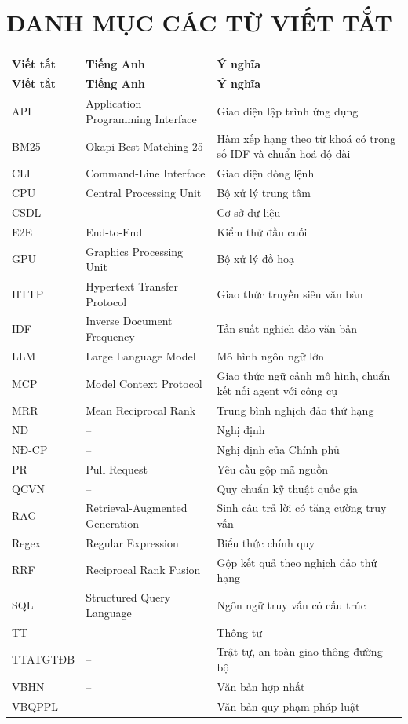 \chapter*{DANH MỤC CÁC TỪ VIẾT TẮT}

\begingroup
\renewcommand{\arraystretch}{1.2}
\begin{longtable}{@{}>{\raggedright\arraybackslash}p{2.6cm}>{\raggedright\arraybackslash}p{5.6cm}>{\raggedright\arraybackslash}p{6.4cm}@{}}
\toprule
\textbf{Viết tắt} & \textbf{Tiếng Anh} & \textbf{Ý nghĩa} \\
\midrule
\endfirsthead
\toprule
\textbf{Viết tắt} & \textbf{Tiếng Anh} & \textbf{Ý nghĩa} \\
\midrule
\endhead
\bottomrule
\endfoot
API & Application Programming Interface & Giao diện lập trình ứng dụng \\
BM25 & Okapi Best Matching 25 & Hàm xếp hạng theo từ khoá có trọng số IDF và chuẩn hoá độ dài \\
CLI & Command-Line Interface & Giao diện dòng lệnh \\
CPU & Central Processing Unit & Bộ xử lý trung tâm \\
CSDL & -- & Cơ sở dữ liệu \\
E2E & End-to-End & Kiểm thử đầu cuối \\
GPU & Graphics Processing Unit & Bộ xử lý đồ hoạ \\
HTTP & Hypertext Transfer Protocol & Giao thức truyền siêu văn bản \\
IDF & Inverse Document Frequency & Tần suất nghịch đảo văn bản \\
LLM & Large Language Model & Mô hình ngôn ngữ lớn \\
MCP & Model Context Protocol & Giao thức ngữ cảnh mô hình, chuẩn kết nối agent với công cụ \\
MRR & Mean Reciprocal Rank & Trung bình nghịch đảo thứ hạng \\
NĐ & -- & Nghị định \\
NĐ-CP & -- & Nghị định của Chính phủ \\
PR & Pull Request & Yêu cầu gộp mã nguồn \\
QCVN & -- & Quy chuẩn kỹ thuật quốc gia \\
RAG & Retrieval-Augmented Generation & Sinh câu trả lời có tăng cường truy vấn \\
Regex & Regular Expression & Biểu thức chính quy \\
RRF & Reciprocal Rank Fusion & Gộp kết quả theo nghịch đảo thứ hạng \\
SQL & Structured Query Language & Ngôn ngữ truy vấn có cấu trúc \\
TT & -- & Thông tư \\
TTATGTĐB & -- & Trật tự, an toàn giao thông đường bộ \\
VBHN & -- & Văn bản hợp nhất \\
VBQPPL & -- & Văn bản quy phạm pháp luật \\
\end{longtable}
\endgroup
